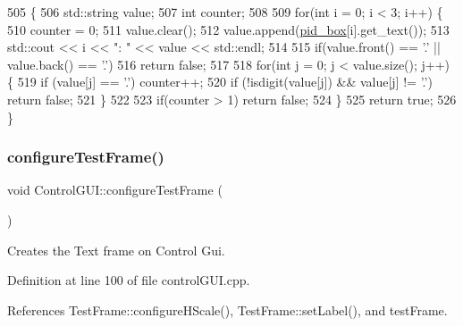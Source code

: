 \begin{DoxyCode}
505                                \{
506     std::string value;
507     \textcolor{keywordtype}{int} counter;
508 
509     \textcolor{keywordflow}{for}(\textcolor{keywordtype}{int} i = 0; i < 3; i++) \{
510         counter = 0;
511         value.clear();
512         value.append(\hyperlink{class_control_g_u_i_ad442701491f6de30be3078a6795af07a}{pid\_box}[i].get\_text());
513         std::cout << i << \textcolor{stringliteral}{": "} << value << std::endl;
514 
515         \textcolor{keywordflow}{if}(value.front() == \textcolor{charliteral}{'.'} || value.back() == \textcolor{charliteral}{'.'})
516             \textcolor{keywordflow}{return} \textcolor{keyword}{false};
517 
518         \textcolor{keywordflow}{for}(\textcolor{keywordtype}{int} j = 0; j < value.size(); j++) \{
519             \textcolor{keywordflow}{if} (value[j] == \textcolor{charliteral}{'.'}) counter++;
520             \textcolor{keywordflow}{if} (!isdigit(value[j]) && value[j] != \textcolor{charliteral}{'.'}) \textcolor{keywordflow}{return} \textcolor{keyword}{false};
521         \}
522 
523         \textcolor{keywordflow}{if}(counter > 1) \textcolor{keywordflow}{return} \textcolor{keyword}{false};
524     \}
525     \textcolor{keywordflow}{return} \textcolor{keyword}{true};
526 \}
\end{DoxyCode}
\mbox{\label{class_control_g_u_i_a3bd87790c510afe1eb2fe7e33474d145}} 
\subsubsection{\texorpdfstring{configure\+Test\+Frame()}{configureTestFrame()}}
{\footnotesize\ttfamily void Control\+G\+U\+I\+::configure\+Test\+Frame (\begin{DoxyParamCaption}{ }\end{DoxyParamCaption})}



Creates the Text frame on Control Gui. 



Definition at line 100 of file control\+G\+U\+I.\+cpp.



References Test\+Frame\+::configure\+H\+Scale(), Test\+Frame\+::set\+Label(), and test\+Frame.


